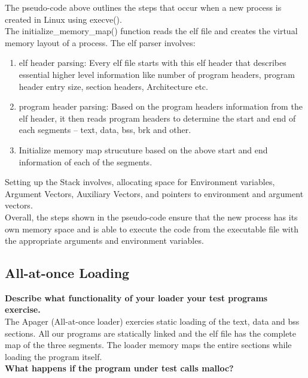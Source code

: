 \documentclass{article}
\begin{document}
The pseudo-code above outlines the steps that occur when a new process is created in Linux using execve().\\ 

The initialize\_memory\_map() function reads the elf file and creates the virtual memory layout of a process.
The elf parser involves:
\begin{enumerate}
    \item elf header parsing: Every elf file starts with this elf header that describes essential higher level 
    information like number of program headers, program header entry size, section headers, Architecture etc.
    \item program header parsing: Based on the program headers information from the elf header, it then reads
    program headers to determine the start and end of each segments -- text, data, bss, brk and other.
    \item Initialize memory map strucuture based on the above start and end information of each of the segments.\\
\end{enumerate}

Setting up the Stack involves, allocating space for Environment variables, Argument Vectors, 
Auxiliary Vectors, and pointers to environment and argument vectors.\\

Overall, the steps shown in the pseudo-code ensure that the new process has its own memory space and is able 
to execute the code from the executable file with the appropriate arguments and environment variables.\\

\subsection{All-at-once Loading}

\textbf{Describe what functionality of your loader your test programs exercise.} \\

The Apager (All-at-once loader) exercies static loading of the text, data and bss sections.
All our programs are statically linked and the elf file has the complete map of the three segments.
The loader memory maps the entire sections while loading the program itself.\\ 

\textbf{What happens if the program under test calls malloc?} \\
\end{document}
